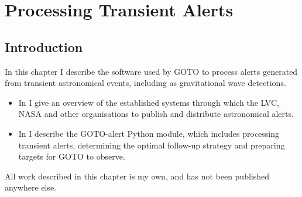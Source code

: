 \chapter{Processing Transient Alerts}
\label{chap:alerts}
\chaptoc{}


\newpage
\section{Introduction}
\label{sec:alerts_intro}
\begin{colsection}

In this chapter I describe the software used by GOTO to process alerts generated from transient astronomical events, including as gravitational wave detections.
%
\begin{itemize}
    \item In  I give an overview of the established systems through which the LVC, NASA and other organisations to publish and distribute astronomical alerts.
    \item In  I describe the GOTO-alert Python module, which includes processing transient alerts, determining the optimal follow-up strategy and preparing targets for GOTO to observe.
\end{itemize}
%
All work described in this chapter is my own, and has not been published anywhere else.

\end{colsection}


\newpage
